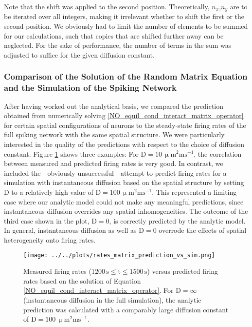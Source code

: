 \documentclass[10pt,a4paper]{article}
\begin{document}
Note that the shift was applied to the second position. Theoretically, $n_x$,$n_y$ are to be iterated over all integers, making it irrelevant whether to shift the first or the second position. We obviously had to limit the number of elements to be summed for our calculations, such that copies that are shifted further away can be neglected. For the sake of performance, the number of terms in the sum was adjusted to suffice for the given diffusion constant.

\subsubsection{Comparison of the Solution of the Random Matrix Equation and the Simulation of the Spiking Network}\label{Section_Rand_Mat_vs_Sim}
After having worked out the analytical basis, we compared the prediction obtained from numerically solving \eqref{NO_equil_cond_interact_matrix_operator} for certain spatial configurations of neurons to the steady-state firing rates of the full spiking network with the same spatial structure. We were particularly interested in the quality of the predictions with respect to the choice of diffusion constant. Figure \ref{Rand_Matrix_Sol_vs_Sim} shows three examples: For $\mathrm{D=10\, \upmu m^2 ms^{-1}}$, the correlation between measured and predicted firing rates is very good. In contrast, we included the---obviously unsuccessful---attempt to predict firing rates for a simulation with instantaneous diffusion based on the spatial structure by setting D to a relatively high value of $\mathrm{D=100\, \upmu m^2 ms^{-1}}$. This represented a limiting case where our analytic model could not make any meaningful predictions, since instantaneous diffusion overrides any spatial inhomogeneities. The outcome of the third case shown in the plot, $\mathrm{D=0}$, is correctly predicted by the analytic model. In general, instantaneous diffusion as well as $\mathrm{D=0}$ overrode the effects of spatial heterogeneity onto firing rates. 
\begin{figure}
\texttt{[image: ../../plots/rates\_matrix\_prediction\_vs\_sim.png]}
\caption[Measured firing rates versus analytically predicted firing rates]{Measured firing rates ($\mathrm{1200\,s \leq t \leq 1500\, s}$) versus predicted firing rates based on the solution of Equation \eqref{NO_equil_cond_interact_matrix_operator}. For $\mathrm{D=\infty}$ (instantaneous diffusion in the full simulation), the analytic prediction was calculated with a comparably large diffusion constant of $\mathrm{D=100\, \upmu m^2 ms^{-1}}$.}
\label{Rand_Matrix_Sol_vs_Sim}
\end{figure}
\end{document}
